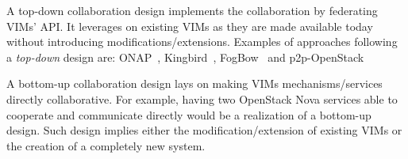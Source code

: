 A top-down collaboration design implements the collaboration by
federating VIMs' API. It leverages on existing VIMs as they are made available today without introducing modifications/extensions. Examples of approaches following a \emph{top-down} design are: ONAP~\cite{onap}, Kingbird~\cite{kingbird}, FogBow~\cite{brasileiro2016fogbow} and p2p-OpenStack~\cite{ericsson-p2p}

A bottom-up collaboration design lays on making VIMs mechanisms/services directly collaborative. For example, having two OpenStack Nova services able to cooperate and communicate directly would be a realization of a bottom-up design. Such design implies either the modification/extension of existing VIMs or the creation of a completely new system.
